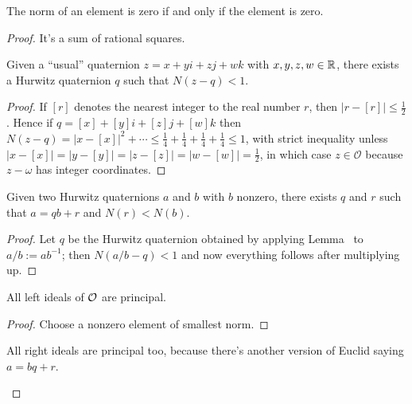 \begin{lemma}
    \label{Hurwitz.norm_eq_zero}
    \leanok
    The norm of an element is zero if and only if the element is zero.
\end{lemma}
\begin{proof}
    \leanok
    It's a sum of rational squares.

\begin{lemma}
    \label{Hurwitz.exists_near}
    Given a ``usual'' quaternion $z=x+yi+zj+wk$ with $x,y,z,w\in\mathbb{R}$,
    there exists a Hurwitz quaternion $q$ such that $N(z-q)<1$.
\end{lemma}
\begin{proof}
  If $[r]$ denotes the nearest integer to the real number $r$, then $|r-[r]|\leq \frac{1}{2}$.
  Hence if $q=[x]+[y]i+[z]j+[w]k$ then $N(z-q)=|x-[x]|^2+\cdots
  \leq \frac{1}{4}+\frac{1}{4}+\frac{1}{4}+\frac{1}{4}\leq 1$, with strict inequality unless
  $|x-[x]|=|y-[y]|=|z-[z]|=|w-[w]|=\frac{1}{2}$, in which case $z\in\mathcal{O}$ because $z-\omega$
  has integer coordinates.
\end{proof}

\begin{lemma}
    \label{Hurwitz.quot_rem}
    \leanok
    Given two Hurwitz quaternions $a$ and $b$ with $b$ nonzero, there exists
    $q$ and $r$ such that $a=qb+r$ and $N(r)<N(b)$.
\end{lemma}
\begin{proof}
  Let $q$ be the Hurwitz quaternion obtained by applying Lemma~\cite{Hurwitz.exists_near}
  to $a/b := ab^{-1}$; then $N(a/b-q)<1$ and now everything follows after multiplying up.
\end{proof}

\begin{corollary}
    \label{Hurwitz.left_ideal_princ}
    \leanok
    All left ideals of $\mathcal{O}$ are principal.
\end{corollary}
\begin{proof}
     Choose a nonzero element of smallest norm.
\end{proof}

\begin{remark}
    All right ideals are principal too, because there's
    another version of Euclid saying $a=bq+r$.
\end{remark}


\end{proof}
